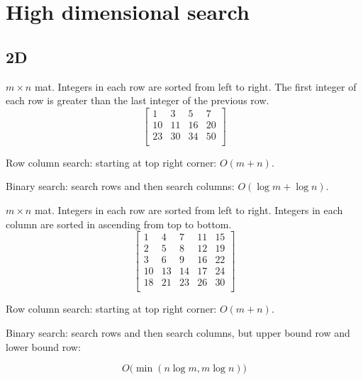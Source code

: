 \section{High dimensional search}
\subsection{2D}
 $m\times n$ mat. Integers in each row are sorted from left to right. The first integer of each row is greater than the last integer of the previous row.
$$
\begin{bmatrix}
1 & 3 & 5 & 7 \\
10 & 11 & 16 & 20 \\
23 & 30 & 34 & 50 \\
\end{bmatrix}
$$

Row column search: starting at top right corner: $O(m+n)$.

Binary search: search rows and then search columns: $O(\log m + \log n)$.


 $m\times n$ mat. Integers in each row are sorted from
left to right. Integers in each column are sorted in ascending from top to bottom.
$$
\begin{bmatrix}
1&   4&  7& 11& 15 \\
2&   5&  8& 12& 19 \\
3&   6&  9& 16& 22 \\
10& 13& 14& 17& 24 \\
18& 21& 23& 26& 30 \\
\end{bmatrix}
$$ 

Row column search: starting at top right corner: $O(m+n)$.

Binary search: search rows and then search columns, but upper bound row and lower bound row: 

$$O\big(\min(n\log m, m\log n)\big)$$

